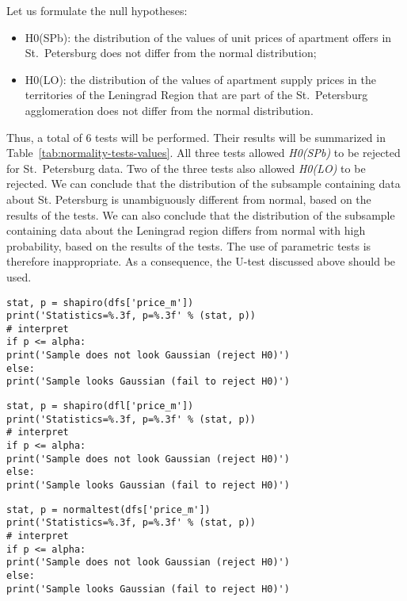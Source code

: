 \documentclass[]{scrreprt}
\begin{document}
Let us formulate the null hypotheses:
\begin{itemize}
	\item H0(SPb): the distribution of the values of unit prices of apartment offers in St.~Petersburg does not differ from the normal distribution;
	\item H0(LO): the distribution of the values of apartment supply prices in the territories of the Leningrad Region that are part of the St.~Petersburg agglomeration does not differ from the normal distribution.
\end{itemize} 
Thus, a total of 6 tests will be performed. Their results will be summarized in Table~\ref{tab:normality-tests-values}. All three tests allowed \emph{H0(SPb)} to be rejected for St.~Petersburg data. Two of the three tests also allowed \emph{H0(LO)} to be rejected. We can conclude that the distribution of the subsample containing data about St. Petersburg is unambiguously different from normal, based on the results of the tests. We can also conclude that the distribution of the subsample containing data about the Leningrad region differs from normal with high probability, based on the results of the tests. The use of parametric tests is therefore inappropriate. As a consequence, the U-test discussed above should be used.
%
\begin{lstlisting}[float=htp, caption = Performing the Shapiro-Wilk test for St.~Petersburg data, firstnumber=1, label= lst:shapiro-wilk-test-spb]
stat, p = shapiro(dfs['price_m'])
print('Statistics=%.3f, p=%.3f' % (stat, p))
# interpret
if p <= alpha:
print('Sample does not look Gaussian (reject H0)')
else:
print('Sample looks Gaussian (fail to reject H0)')
\end{lstlisting}
%
\begin{lstlisting}[float=htp, caption = Performing the Shapiro-Wilk test for Leningrad Region data, firstnumber=1, label= lst:shapiro-wilk-test-lo]
stat, p = shapiro(dfl['price_m'])
print('Statistics=%.3f, p=%.3f' % (stat, p))
# interpret
if p <= alpha:
print('Sample does not look Gaussian (reject H0)')
else:
print('Sample looks Gaussian (fail to reject H0)')
\end{lstlisting}  
%
\begin{lstlisting}[float=htp, caption = Performing the D'Agostino's K-squared test for St.~Petersburg data, firstnumber=1, label= lst:K^2-D'Agostino-test-spb]
stat, p = normaltest(dfs['price_m'])
print('Statistics=%.3f, p=%.3f' % (stat, p))
# interpret
if p <= alpha:
print('Sample does not look Gaussian (reject H0)')
else:
print('Sample looks Gaussian (fail to reject H0)')
\end{lstlisting}
\end{document}
